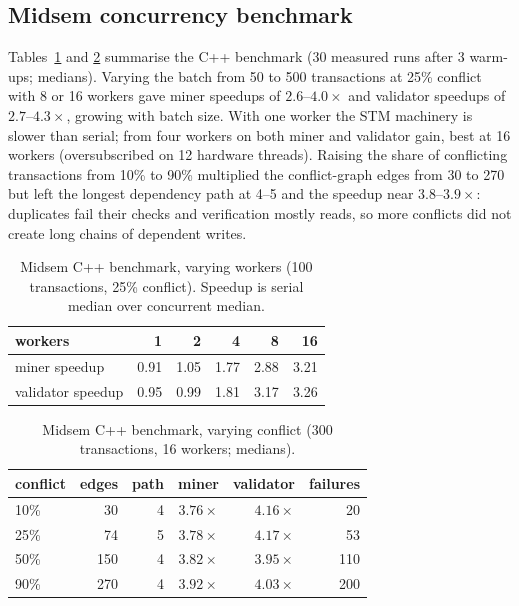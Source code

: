 \documentclass[10pt,twocolumn]{article}
\begin{document}
\subsection{Midsem concurrency benchmark}
\label{sec:results-midsem}
Tables~\ref{tab:threads} and \ref{tab:conflict} summarise the C++ benchmark (30 measured runs after 3 warm-ups; medians). Varying the batch from 50 to 500 transactions at 25\% conflict with 8 or 16 workers gave miner speedups of $2.6$--$4.0\times$ and validator speedups of $2.7$--$4.3\times$, growing with batch size. With one worker the STM machinery is slower than serial; from four workers on both miner and validator gain, best at 16 workers (oversubscribed on 12 hardware threads). Raising the share of conflicting transactions from 10\% to 90\% multiplied the conflict-graph edges from 30 to 270 but left the longest dependency path at 4--5 and the speedup near $3.8$--$3.9\times$: duplicates fail their checks and verification mostly reads, so more conflicts did not create long chains of dependent writes.

\begin{table}[!t]
\caption{Midsem C++ benchmark, varying workers (100 transactions, 25\% conflict). Speedup is serial median over concurrent median.}
\label{tab:threads}
\centering\footnotesize
\begin{tabular}{@{}lrrrrr@{}}
\toprule
workers & 1 & 2 & 4 & 8 & 16\\
\midrule
miner speedup & 0.91 & 1.05 & 1.77 & 2.88 & 3.21\\
validator speedup & 0.95 & 0.99 & 1.81 & 3.17 & 3.26\\
\bottomrule
\end{tabular}
\end{table}

\begin{table}[!t]
\caption{Midsem C++ benchmark, varying conflict (300 transactions, 16 workers; medians).}
\label{tab:conflict}
\centering\footnotesize
\begin{tabular}{@{}lrrrrr@{}}
\toprule
conflict & edges & path & miner & validator & failures\\
\midrule
10\% & 30 & 4 & $3.76\times$ & $4.16\times$ & 20\\
25\% & 74 & 5 & $3.78\times$ & $4.17\times$ & 53\\
50\% & 150 & 4 & $3.82\times$ & $3.95\times$ & 110\\
90\% & 270 & 4 & $3.92\times$ & $4.03\times$ & 200\\
\bottomrule
\end{tabular}
\end{table}
\end{document}

